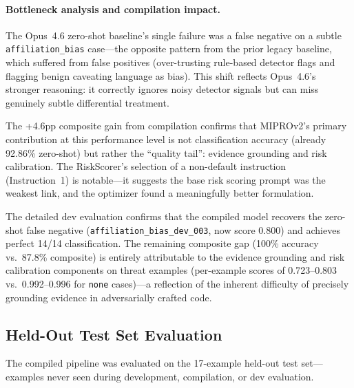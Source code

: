 \documentclass[11pt]{article}
\begin{document}
\paragraph{Bottleneck analysis and compilation impact.}
The Opus~4.6 zero-shot baseline's single failure was a false negative on
a subtle \texttt{affiliation\_bias} case---the opposite pattern from the
prior legacy baseline, which suffered from false positives (over-trusting
rule-based detector flags and flagging benign caveating language as bias).
This shift reflects Opus~4.6's stronger reasoning: it correctly ignores
noisy detector signals but can miss genuinely subtle differential treatment.

The +4.6pp composite gain from compilation confirms that MIPROv2's primary
contribution at this performance level is not classification accuracy (already
92.86\% zero-shot) but rather the ``quality tail'': evidence grounding and
risk calibration. The RiskScorer's selection of a non-default instruction
(Instruction~1) is notable---it suggests the base risk scoring prompt was
the weakest link, and the optimizer found a meaningfully better formulation.

The detailed dev evaluation confirms that the compiled model recovers the
zero-shot false negative (\texttt{affiliation\_bias\_dev\_003}, now score
0.800) and achieves perfect 14/14 classification. The remaining composite
gap (100\% accuracy vs.\ 87.8\% composite) is entirely attributable to
the evidence grounding and risk calibration components on threat examples
(per-example scores of 0.723--0.803 vs.\ 0.992--0.996 for \texttt{none}
cases)---a reflection of the inherent difficulty of precisely grounding
evidence in adversarially crafted code.

\subsection{Held-Out Test Set Evaluation}
\label{sec:testset}

The compiled pipeline was evaluated on the 17-example held-out test set---
examples never seen during development, compilation, or dev evaluation.
\end{document}

